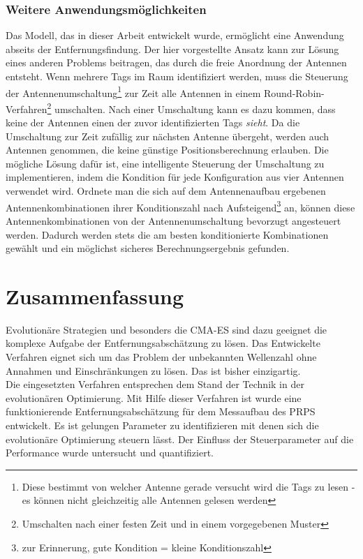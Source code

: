 \subsubsection{Weitere Anwendungsmöglichkeiten}
%
Das Modell, das in dieser Arbeit entwickelt wurde, ermöglicht eine Anwendung abseits der Entfernungsfindung. Der hier vorgestellte Ansatz kann zur Lösung eines anderen Problems beitragen, das durch die freie Anordnung der Antennen entsteht. Wenn mehrere Tags im Raum identifiziert werden, muss die Steuerung der Antennenumschaltung\footnote{Diese bestimmt von welcher Antenne gerade versucht wird die Tags zu lesen - es können nicht gleichzeitig alle Antennen gelesen werden} zur Zeit alle Antennen in einem Round-Robin-Verfahren\footnote{Umschalten nach einer festen Zeit und in einem vorgegebenen Muster} umschalten. Nach einer Umschaltung kann es dazu kommen, dass keine der Antennen einen der zuvor identifizierten Tags \textit{sieht}. Da die Umschaltung zur Zeit zufällig zur nächsten Antenne übergeht, werden auch Antennen genommen, die keine günstige Positionsberechnung erlauben. Die mögliche Lösung dafür ist, eine intelligente Steuerung der Umschaltung zu implementieren, indem die Kondition für jede Konfiguration aus vier Antennen verwendet wird. Ordnete man die sich auf dem Antennenaufbau ergebenen Antennenkombinationen ihrer Konditionszahl nach Aufsteigend\footnote{zur Erinnerung, gute Kondition = kleine Konditionszahl} an, können diese Antennenkombinationen von der Antennenumschaltung bevorzugt angesteuert werden. Dadurch werden stets die am besten konditionierte Kombinationen gewählt und ein möglichst sicheres Berechnungsergebnis gefunden.
%

\section{Zusammenfassung}
%
Evolutionäre Strategien und besonders die CMA-ES sind dazu geeignet die komplexe Aufgabe der Entfernungsabschätzung zu lösen. Das Entwickelte Verfahren eignet sich um das Problem der unbekannten Wellenzahl ohne Annahmen und Einschränkungen zu lösen. Das ist bisher einzigartig.\\

Die eingesetzten Verfahren entsprechen dem Stand der Technik in der evolutionären Optimierung. Mit Hilfe dieser Verfahren ist wurde eine funktionierende Entfernungsabschätzung für dem Messaufbau des PRPS entwickelt. Es ist gelungen Parameter zu identifizieren mit denen sich die evolutionäre Optimierung steuern lässt. Der Einfluss der Steuerparameter auf die Performance wurde untersucht und quantifiziert.\\

